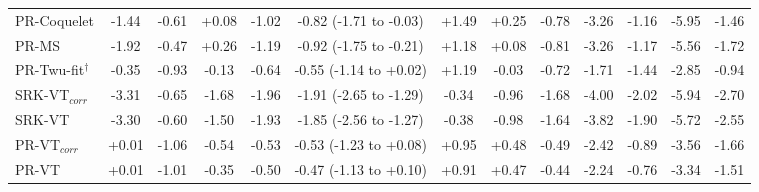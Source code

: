 \begin{table}[H]
\begin{tabular}{lcccccccccccc}
PR-Coquelet & -1.44 & -0.61 & +0.08 & -1.02 & -0.82 (-1.71 to -0.03) & +1.49 & +0.25 & -0.78 & -3.26 & -1.16 & -5.95 & -1.46 \\
PR-MS & -1.92 & -0.47 & +0.26 & -1.19 & -0.92 (-1.75 to -0.21) & +1.18 & +0.08 & -0.81 & -3.26 & -1.17 & -5.56 & -1.72 \\
PR-Twu-fit$^{\dagger}$ & -0.35 & -0.93 & -0.13 & -0.64 & -0.55 (-1.14 to +0.02) & +1.19 & -0.03 & -0.72 & -1.71 & -1.44 & -2.85 & -0.94 \\
\midrule
SRK-VT$_{corr}$ & -3.31 & -0.65 & -1.68 & -1.96 & -1.91 (-2.65 to -1.29) & -0.34 & -0.96 & -1.68 & -4.00 & -2.02 & -5.94 & -2.70 \\
SRK-VT & -3.30 & -0.60 & -1.50 & -1.93 & -1.85 (-2.56 to -1.27) & -0.38 & -0.98 & -1.64 & -3.82 & -1.90 & -5.72 & -2.55 \\
PR-VT$_{corr}$ & +0.01 & -1.06 & -0.54 & -0.53 & -0.53 (-1.23 to +0.08) & +0.95 & +0.48 & -0.49 & -2.42 & -0.89 & -3.56 & -1.66 \\
PR-VT & +0.01 & -1.01 & -0.35 & -0.50 & -0.47 (-1.13 to +0.10) & +0.91 & +0.47 & -0.44 & -2.24 & -0.76 & -3.34 & -1.51 \\
\bottomrule
\end{tabular}
\end{table}
